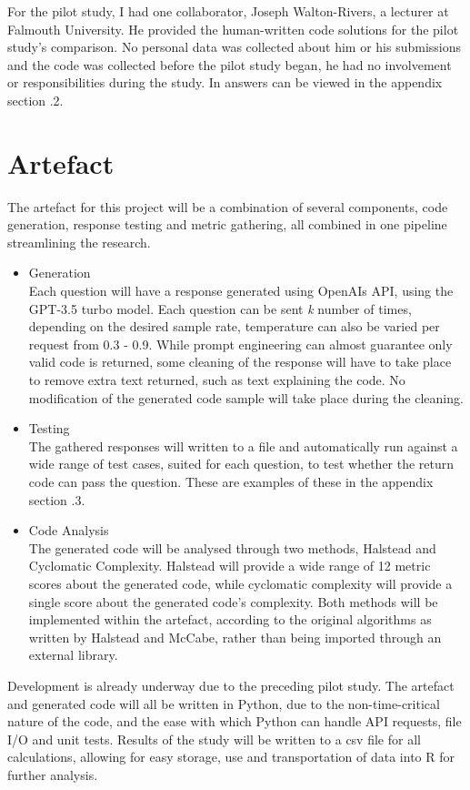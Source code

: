 \documentclass[manuscript,screen,review,sigconf]{acmart}
\begin{document}
For the pilot study, I had one collaborator, Joseph Walton-Rivers, a lecturer at Falmouth University. He provided the human-written code solutions for the pilot study's comparison. No personal data was collected about him or his submissions and the code was collected before the pilot study began, he had no involvement or responsibilities during the study. In answers can be viewed in the appendix section .2. %

\section{Artefact}
The artefact for this project will be a combination of several components, code generation, response testing and metric gathering, all combined in one pipeline streamlining the research.
\begin{itemize}
    \item Generation\\
    Each question will have a response generated using OpenAIs API, using the GPT-3.5 turbo model. Each question can be sent \textit{k} number of times, depending on the desired sample rate, temperature can also be varied per request from 0.3 - 0.9. While prompt engineering can almost guarantee only valid code is returned, some cleaning of the response will have to take place to remove extra text returned, such as text explaining the code. No modification of the generated code sample will take place during the cleaning.
    \item Testing\\
    The gathered responses will written to a file and automatically run against a wide range of test cases, suited for each question, to test whether the return code can pass the question. These are examples of these in the appendix section .3.
    \item Code Analysis\\
    The generated code will be analysed through two methods, Halstead and Cyclomatic Complexity. Halstead will provide a wide range of 12 metric scores about the generated code, while cyclomatic complexity will provide a single score about the generated code's complexity. Both methods will be implemented within the artefact, according to the original algorithms as written by Halstead and McCabe, rather than being imported through an external library.
\end{itemize}

Development is already underway due to the preceding pilot study. The artefact and generated code will all be written in Python, due to the non-time-critical nature of the code, and the ease with which Python can handle API requests, file I/O and unit tests. Results of the study will be written to a csv file for all calculations, allowing for easy storage, use and transportation of data into R for further analysis.
\end{document}
